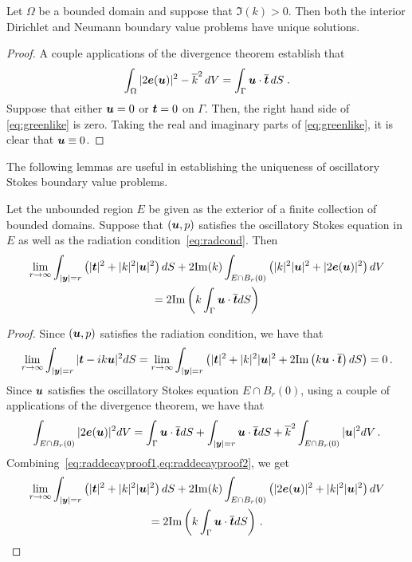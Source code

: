 \begin{thrm}
  Let $\Omega$ be a bounded domain and suppose that
  $\Im (k) > 0$. Then both the interior
  Dirichlet and Neumann boundary value problems have
  unique solutions.
\end{thrm}
\begin{proof}
  A couple applications of the divergence theorem establish
  that
  \begin{equation} \label{eq:greenlike}
    \int_\Omega |2{\boldsymbol e}({\boldsymbol u})|^2 - \overline{k}^2 \, dV
    = \int_\Gamma {\boldsymbol u} \cdot \overline{{\boldsymbol t}} \, dS \; . 
  \end{equation}
  Suppose that either ${\boldsymbol u} = 0$ or ${\boldsymbol t} = 0$ on $\Gamma$.
  Then, the right hand side of \cref{eq:greenlike} is
  zero. Taking the real and imaginary parts of \cref{eq:greenlike},
  it is clear that ${\boldsymbol u} \equiv 0$.
\end{proof}

The following lemmas are useful in establishing the uniqueness
of oscillatory Stokes boundary value problems.

\begin{lem}
  \label{lem:rep}
  Let the unbounded region $E$ be given as the exterior
  of a finite collection of bounded domains.
  Suppose that $({\boldsymbol u},p)$ satisfies the oscillatory Stokes equation in 
  $E$ as well as the radiation condition~\cref{eq:radcond}. 
Then 
\begin{multline}
\label{eq:repinfest}  
\lim_{r\to\infty}
\int_{|{\boldsymbol y}|=r} \left( |{\boldsymbol t}|^2 + |k|^2 |{\boldsymbol u}|^2 \right) dS +
2 {\textrm{\textup{Im}}}(k) \int_{E \cap B_{r}(0)} \left(|k|^2 |{\boldsymbol u}|^2 + |2{\boldsymbol e}({\boldsymbol u})|^2 \right)
dV \\
= 2 {\textrm{\textup{Im}}} \left( k \int_{\Gamma} {\boldsymbol u} \cdot
\overline{{\boldsymbol t}} dS  \right) 
\end{multline}

\end{lem}

\begin{proof}
Since $({\boldsymbol u},p)$ satisfies the radiation condition, we have that
\begin{equation}
\lim_{r\to\infty} \int_{|{\boldsymbol y}|=r} | {\boldsymbol t} - i k {\boldsymbol u}|^2 dS = 
\lim_{r\to\infty} \int_{|{\boldsymbol y}| =r} \left( |{\boldsymbol t}|^2 + |k|^2|{\boldsymbol u}|^2 + 2 {\textrm{\textup{Im}}} 
\left( k {\boldsymbol u}\cdot \overline{{\boldsymbol t}} \right) dS \label{eq:raddecayproof1}
\right) = 0 \, . 
\end{equation}
Since ${\boldsymbol u}$ satisfies the oscillatory Stokes equation $E \cap B_{r}(0)$,
using a couple of applications of the divergence theorem, we have that
\begin{equation}
\int_{E\cap B_{r}(0)} |2 {\boldsymbol e}({\boldsymbol u})|^2 dV =
\int_{\Gamma} {\boldsymbol u} \cdot \overline{{\boldsymbol t}} dS
+ \int_{|{\boldsymbol y}|=r} {\boldsymbol u} \cdot \overline{{\boldsymbol t}} dS + \overline{k}^2 
\int_{E \cap B_{r}(0)} |{\boldsymbol u}|^2 dV \,. \label{eq:raddecayproof2}
\end{equation}
Combining~\cref{eq:raddecayproof1,eq:raddecayproof2}, we get
\begin{multline*}
\lim_{r\to\infty} \int_{|{\boldsymbol y}|=r}\left(|{\boldsymbol t}|^2 + |k|^2 |{\boldsymbol u}|^2 \right) dS 
+ 2 {\textrm{\textup{Im}}}(k)\int_{E \cap B_{r}(0)} \left(|2{\boldsymbol e}({\boldsymbol u})|^2 + |k|^2 |{\boldsymbol u}|^2 
\right) dV \\
= 2{\textrm{\textup{Im}}} \left ( k \int_{\Gamma} {\boldsymbol u} \cdot \overline{{\boldsymbol t}} dS \right) \, .
\end{multline*}
\end{proof}

